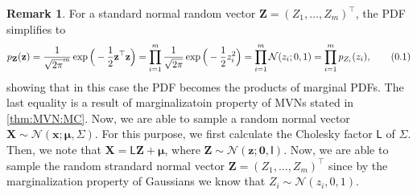 \documentclass[10pt]{article}
\theoremstyle{definition}
\newtheorem*{rem}{Remark}
\newcommand\eqnum{\addtocounter{equation}{1}\tag{\arabic{section}.\arabic{equation}}}
\begin{document}
\begin{rem}
For a standard normal random vector $\mathbf{Z}=(Z_1,\dots,Z_m)^{\top}$, the PDF simplifies to
\begin{align*}
p_{\mathbf{Z}}(\mathbf{z}) 
=  \frac{1}{\sqrt{2\pi}^m} \exp\Big(-\frac{1}{2}\mathbf{z}^{\top}\mathbf{z}\Big) 
= \prod_{i=1}^{m}\frac{1}{\sqrt{2\pi}}\exp\Big(-\frac{1}{2}z_i^2\Big) 
= \prod_{i=1}^{m}\mathcal{N}(z_i; 0, 1)=\prod_{i=1}^{m}p_{Z_i}(z_i),
\eqnum
\label{eq:Ran:Vec:SN:PDF}
\end{align*}
showing that in this case the PDF becomes the products of marginal PDFs. The last equality is a result of marginalizatoin property of MVNs stated in \cref{thm:MVN:MC}. Now, we are able to sample a random normal vector $\mathbf{X}\sim\mathcal{N}(\mathbf{x}; \boldsymbol{\mu}, \mathsf{\Sigma})$. For this purpose, we first calculate the Cholesky factor $\mathsf{L}$ of $\mathsf{\Sigma}$. Then, we note that $\mathbf{X} = \mathsf{L} \mathbf{Z} + \boldsymbol{\mu}$, where $\mathbf{Z}\sim\mathcal{N}(\mathbf{z}; \mathbf{0}, \mathsf{I})$. Now, we are able to sample the random strandard normal vector $\mathbf{Z}=(Z_1,\dots,Z_m)^{\top}$ since by the marginalization property of Gaussians we know that $Z_i\sim\mathcal{N}(z_i, 0, 1)$.
\label{exmp:sample}
\end{rem}
\end{document}
